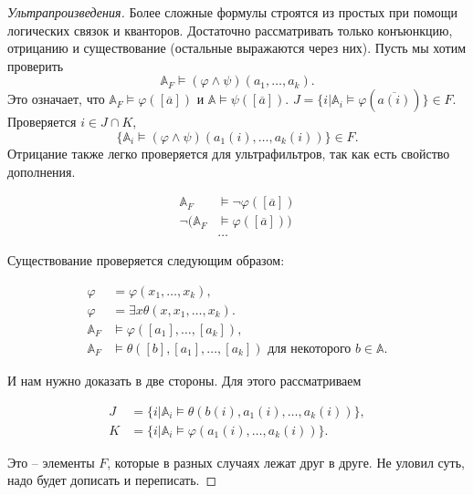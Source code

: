 \begin{proof}[Ультрапроизведения]
    Более сложные формулы строятся из простых при помощи логических связок и кванторов. Достаточно рассматривать только конъюнкцию, отрицанию и существование (остальные выражаются через них). Пусть мы хотим проверить $$\mathbb{A}_F \models (\varphi \wedge \psi)(a_1, \ldots, a_k).$$ Это означает, что $\mathbb{A}_F \models \varphi([\overline{a}])$ и $\mathbb{A} \models \psi ([\overline{a}])$. $J = \{i | \mathbb{A}_i \models \varphi(\overline{a(i)})\} \in F$. Проверяется $i \in J \cap K$, $$\{\mathbb{A}_i \models (\varphi \wedge \psi)(a_1(i), \ldots, a_k(i))\} \in F.$$ Отрицание также легко проверяется для ультрафильтров, так как есть свойство дополнения. 

    \begin{equation*}
        \begin{aligned}
            \mathbb{A}_F &\models \neg \varphi([\overline{a}]) \\ 
            \neg (\mathbb{A}_F &\models \varphi([\overline{a}])) \\ 
            & \ldots
        \end{aligned}
    \end{equation*} 

    Существование проверяется следующим образом: 

    \begin{equation*}
        \begin{aligned}
            \varphi &= \varphi(x_1, \ldots, x_k), \\ 
            \varphi &= \exists x \theta (x, x_1, \ldots, x_k). \\ 
            \mathbb{A}_F &\models \varphi([a_1], \ldots, [a_k]), \\ 
            \mathbb{A}_F &\models \theta([b], [a_1], \ldots, [a_k]) \text{ для некоторого } b \in \mathbb{A}.  
        \end{aligned}
    \end{equation*} 

    И нам нужно доказать в две стороны. Для этого рассматриваем  

    \begin{equation*}
        \begin{aligned}
            J &= \{i | \mathbb{A}_i \models \theta(b(i), a_1(i), \ldots, a_k(i))\}, \\ 
            K &= \{i | \mathbb{A}_i \models \varphi(a_1(i), \ldots, a_k(i))\}.
        \end{aligned}
    \end{equation*} 

    Это -- элементы $F$, которые в разных случаях лежат друг в друге. Не уловил суть, надо будет дописать и переписать.
\end{proof} 

